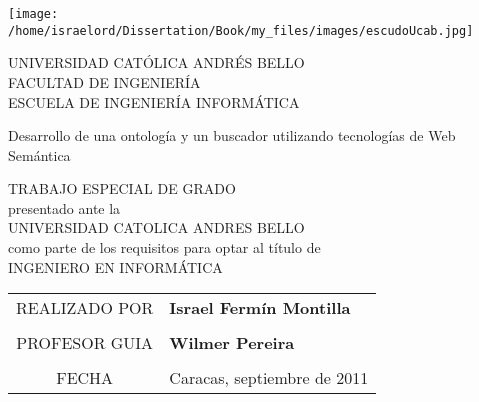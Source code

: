 \begin{center}
\parbox{4cm}{\texttt{[image: /home/israelord/Dissertation/Book/my\_files/images/escudoUcab.jpg]}}\parbox{9cm}{\begin{center}
UNIVERSIDAD CATÓLICA ANDRÉS BELLO \\
FACULTAD DE INGENIERÍA \\
ESCUELA DE INGENIERÍA INFORMÁTICA \\
\end{center}}

\vspace{\fill}


\begin{LARGE}
Desarrollo de una ontología y un buscador utilizando tecnologías de Web Semántica
\end{LARGE}

\vspace{\fill}

TRABAJO ESPECIAL DE GRADO\\
presentado ante la\\
UNIVERSIDAD CATOLICA ANDRES BELLO\\
como parte de los requisitos para optar al t\'itulo de\\
INGENIERO EN INFORM\'ATICA

\vspace{\fill}

{
\begin{tabular}{cl}
REALIZADO POR & \textbf{Israel Fermín Montilla}\tabularnewline
\multicolumn{2}{c}{}\tabularnewline
PROFESOR GUIA & \textbf{Wilmer Pereira}\tabularnewline
\multicolumn{2}{c}{}\tabularnewline
FECHA & Caracas, septiembre de 2011\tabularnewline
\end{tabular}
}


\end{center}
